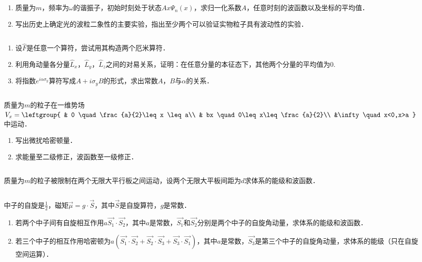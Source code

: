 
\subsection{ }
\begin{enumerate}
\item 质量为$m$，频率为$\omega$的谐振子，初始时刻处于状态$Ax\varPsi_{n}(x)$，求归一化系数$A$，任意时刻的波函数以及坐标的平均值．
\item 写出历史上确定光的波粒二象性的主要实验，指出至少两个可以验证实物粒子具有波动性的实验．
\end{enumerate}
\subsection{ }
\begin{enumerate}
\item 设$\hat{F}$是任意一个算符，尝试用其构造两个厄米算符．
\item 利用角动量各分量$\hat{L}_{x}$，$\hat{L}_{y}$，$\hat{L}_{z}$之间的对易关系，证明：在任意分量的本征态下，其他两个分量的平均值为0.
\item 将指数$e^{i\alpha \sigma_{y}}$算符写成$A+i\sigma_{y}B$的形式，求出常数$A$，$B$与$\alpha$的关系．
\end{enumerate}
\subsection{ }
质量为$m$的粒子在一维势场$V_{x}=\leftgroup{
    & 0 \quad \frac{a}{2}\leq x \leq a\\
    & bx \quad 0\leq x\leq\frac{a}{2}\\
    &\infty \quad x<0,x>a
    }$中运动．\\
\begin{enumerate}
\item 写出微扰哈密顿量．
\item 求能量至二级修正，波函数至一级修正．
\end{enumerate}
\subsection{ }
质量为$m$的粒子被限制在两个无限大平行板之间运动，设两个无限大平板间距为$d$求体系的能级和波函数．
\subsection{ }
中子的自旋是$\frac{1}{2}$，磁矩$\vec{\mu}=g\cdot\vec{S}$，其中$\vec{S}$是自旋算符，$g$是常数．
\begin{enumerate}
\item 若两个中子间有自旋相互作用$a\vec{S_1}\cdot\vec{S_2}$，其中$a$是常数，$\vec{S_1}$和$\vec{S_2}$分别是两个中子的自旋角动量，求体系的能级和波函数．
\item 若三个中子的相互作用哈密顿为$a(\vec{S_{1}}\cdot\vec{S_{2}}+\vec{S_{2}}\cdot\vec{S_{3}}+\vec{S_{3}}\cdot\vec{S_{1}})$，其中$a$是常数，$\vec{S_{3}}$是第三个中子的自旋角动量，求体系的能级（只在自旋空间运算）．
\end{enumerate}